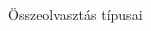 \documentclass[english, aspectratio=169]{beamer}
\begin{document}
\begin{frame}{Összeolvasztás típusai}
\begin{columns}
\begin{column}{0.5\textwidth}
\begin{center}
\end{center}
\end{column}
\end{columns}
\end{frame}
\end{document}
